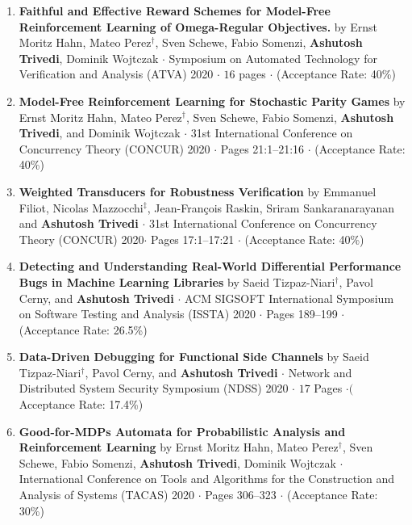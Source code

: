 \documentclass{article}
\begin{document}
\begin{enumerate}
\item
{\bf Faithful and Effective Reward Schemes for Model-Free Reinforcement Learning
  of Omega-Regular Objectives.} by
Ernst Moritz Hahn, Mateo Perez${}^{\dag}$, Sven Schewe, Fabio Somenzi, {\bf Ashutosh
Trivedi}, Dominik Wojtczak $\cdot$ Symposium on Automated Technology for Verification and
Analysis (ATVA) 2020 $\cdot$ $16$ pages $\cdot$ (Acceptance
Rate: 40\%)
\item 
  {\bf Model-Free Reinforcement Learning for Stochastic Parity Games} by Ernst
  Moritz Hahn, Mateo Perez${}^{\dag}$, Sven Schewe, Fabio Somenzi, {\bf Ashutosh
   Trivedi}, and
  Dominik Wojtczak  $\cdot$  31st International Conference
  on Concurrency Theory (CONCUR) 2020 $\cdot$ Pages 21:1--21:16 $\cdot$ (Acceptance
  Rate: 40\%)
\item 
  {\bf Weighted Transducers for Robustness Verification} by Emmanuel Filiot,
  Nicolas Mazzocchi${}^{\ddag}$, Jean-François Raskin, Sriram Sankaranarayanan and {\bf Ashutosh Trivedi} $\cdot$   31st International Conference
  on Concurrency Theory (CONCUR) 2020$\cdot$ Pages 17:1--17:21  $\cdot$ (Acceptance
  Rate: 40\%)
\item
  {\bf Detecting and Understanding Real-World Differential Performance Bugs in
    Machine Learning Libraries} by Saeid Tizpaz-Niari${}^{\dag}$,
  Pavol Cerny, and {\bf Ashutosh Trivedi} $\cdot$  ACM SIGSOFT International Symposium
  on Software Testing and Analysis (ISSTA) 2020 $\cdot$ Pages 189–199 $\cdot$ (Acceptance
  Rate: 26.5\%)
\item
  {\bf Data-Driven Debugging for Functional Side Channels} by Saeid Tizpaz-Niari${}^{\dag}$,
  Pavol Cerny, and {\bf Ashutosh Trivedi} $\cdot$  Network and Distributed System
  Security Symposium (NDSS) 2020 $\cdot$  $17$ Pages $\cdot($ Acceptance Rate: 17.4\%)
  
\item {\bf Good-for-MDPs Automata for Probabilistic Analysis and Reinforcement
  Learning} by Ernst
  Moritz Hahn, Mateo Perez${}^{\dag}$, Sven Schewe, Fabio Somenzi, {\bf Ashutosh Trivedi},
  Dominik Wojtczak $\cdot$ International Conference on Tools and Algorithms for
  the Construction and Analysis of Systems (TACAS) 2020 $\cdot$ Pages 306–323
  $\cdot$ (Acceptance
  Rate: 30\%)


\end{enumerate}
\end{document}
